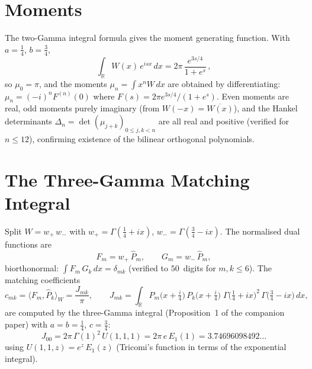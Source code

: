 \documentclass[11pt,a4paper]{article}
\newcommand{\R}{\mathbb{R}}
\begin{document}
\section{Moments}

The two-Gamma integral formula gives the moment generating function.
With $a = \tfrac14$, $b = \tfrac34$,
\begin{equation}\label{eq:mgf}
  \int_\R W(x)\,e^{isx}\,dx
  = 2\pi\,\frac{e^{3s/4}}{1 + e^s}\,,
\end{equation}
so $\mu_0 = \pi$, and the moments $\mu_n = \int x^n W\,dx$ are
obtained by differentiating: $\mu_n = (-i)^n F^{(n)}(0)$ where
$F(s) = 2\pi e^{3s/4}/(1+e^s)$.  Even moments are real, odd moments
purely imaginary (from $W(-x) = \overline{W(x)}$), and the Hankel
determinants $\Delta_n = \det(\mu_{j+k})_{0 \le j,k < n}$ are all
real and positive (verified for $n \le 12$), confirming existence
of the bilinear orthogonal polynomials.

\section{The Three-Gamma Matching Integral}

Split $W = w_+\,w_-$ with $w_+ = \Gamma(\tfrac14+ix)$,
$w_- = \Gamma(\tfrac34-ix)$.  The normalised dual functions are
\[
  F_m = w_+\,\widehat{P}_m, \qquad G_m = w_-\,\widehat{P}_m,
\]
biorthonormal: $\int F_m\,G_k\,dx = \delta_{mk}$ (verified to
$50$~digits for $m,k \le 6$).  The matching coefficients
\[
  c_{mk} = \langle F_m, \widehat{P}_k\rangle_W
  = \frac{J_{mk}}{\pi}, \qquad
  J_{mk} = \int_\R P_m\bigl(x+\tfrac{i}{4}\bigr)\,
    P_k\bigl(x+\tfrac{i}{4}\bigr)\;
    \Gamma\bigl(\tfrac14+ix\bigr)^2\,
    \Gamma\bigl(\tfrac34-ix\bigr)\,dx,
\]
are computed by the three-Gamma integral (Proposition~1 of the
companion paper) with $a = b = \tfrac14$, $c = \tfrac34$:
\begin{equation}\label{eq:base}
  J_{00}
  = 2\pi\,\Gamma(1)^2\,U(1, 1, 1)
  = 2\pi\,e\,E_1(1)
  = 3.74696098492\ldots
\end{equation}
using $U(1,1,z) = e^z\,E_1(z)$ (Tricomi's function in terms
of the exponential integral).

\end{document}
